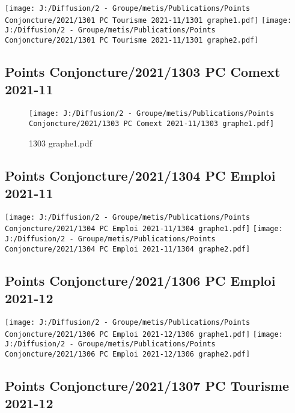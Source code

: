 \documentclass[
]{article}
\begin{document}
\texttt{[image: J:/Diffusion/2 - Groupe/metis/Publications/Points Conjoncture/2021/1301 PC Tourisme 2021-11/1301 graphe1.pdf]}
\texttt{[image: J:/Diffusion/2 - Groupe/metis/Publications/Points Conjoncture/2021/1301 PC Tourisme 2021-11/1301 graphe2.pdf]}

\hypertarget{points-conjoncture20211303-pc-comext-2021-11}{%
\subsection{Points Conjoncture/2021/1303 PC Comext
2021-11}\label{points-conjoncture20211303-pc-comext-2021-11}}

\begin{figure}
\centering
\texttt{[image: J:/Diffusion/2 - Groupe/metis/Publications/Points Conjoncture/2021/1303 PC Comext 2021-11/1303 graphe1.pdf]}
\caption{1303 graphe1.pdf}
\end{figure}

\hypertarget{points-conjoncture20211304-pc-emploi-2021-11}{%
\subsection{Points Conjoncture/2021/1304 PC Emploi
2021-11}\label{points-conjoncture20211304-pc-emploi-2021-11}}

\texttt{[image: J:/Diffusion/2 - Groupe/metis/Publications/Points Conjoncture/2021/1304 PC Emploi 2021-11/1304 graphe1.pdf]}
\texttt{[image: J:/Diffusion/2 - Groupe/metis/Publications/Points Conjoncture/2021/1304 PC Emploi 2021-11/1304 graphe2.pdf]}

\hypertarget{points-conjoncture20211306-pc-emploi-2021-12}{%
\subsection{Points Conjoncture/2021/1306 PC Emploi
2021-12}\label{points-conjoncture20211306-pc-emploi-2021-12}}

\texttt{[image: J:/Diffusion/2 - Groupe/metis/Publications/Points Conjoncture/2021/1306 PC Emploi 2021-12/1306 graphe1.pdf]}
\texttt{[image: J:/Diffusion/2 - Groupe/metis/Publications/Points Conjoncture/2021/1306 PC Emploi 2021-12/1306 graphe2.pdf]}

\hypertarget{points-conjoncture20211307-pc-tourisme-2021-12}{%
\subsection{Points Conjoncture/2021/1307 PC Tourisme
2021-12}\label{points-conjoncture20211307-pc-tourisme-2021-12}}
\end{document}
